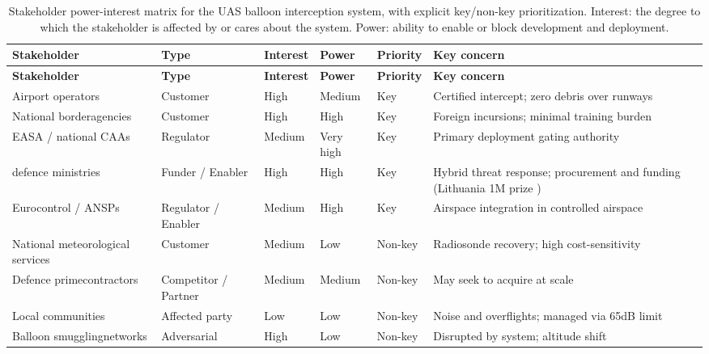 \begin{longtable}{@{}p{3.5cm}p{1.4cm}p{1.3cm}p{1.4cm}p{1.3cm}p{4.5cm}@{}}

\caption{Stakeholder power-interest matrix for the UAS balloon interception system, with explicit key/non-key prioritization. Interest: the degree to which the stakeholder is affected by or cares about the system. Power: ability to enable or block development and deployment.}
\label{tab:stakeholders} \\

\toprule
\textbf{Stakeholder} & \textbf{Type} &
  \textbf{Interest} & \textbf{Power} &
  \textbf{Priority} & \textbf{Key concern} \\
\midrule
\endfirsthead

\toprule
\textbf{Stakeholder} & \textbf{Type} &
  \textbf{Interest} & \textbf{Power} &
  \textbf{Priority} & \textbf{Key concern} \\
\midrule
\endhead

Airport operators & Customer & High & Medium & Key & Certified intercept; zero debris over runways \\[4pt]
 
National border\newline agencies & Customer & High & High & Key & Foreign incursions; minimal training burden \\[4pt]
 
EASA / national CAAs & Regulator & Medium & Very high & Key & Primary deployment gating authority \\[4pt]
 
defence ministries & Funder / Enabler & High & High & Key & Hybrid threat response; procurement and funding (Lithuania \texteuro{}1M prize \cite{RFE/RLBelarusService2025UpBoth}) \\[4pt]
 
Eurocontrol / ANSPs & Regulator / Enabler & Medium & High & Key & Airspace integration in controlled airspace \\[4pt]
 
National meteorological services & Customer & Medium & Low & Non-key & Radiosonde recovery; high cost-sensitivity \\[4pt]
 
Defence prime\newline contractors & Competitor / Partner & Medium & Medium & Non-key & May seek to acquire at scale \\[4pt]
 
Local communities & Affected party & Low & Low & Non-key & Noise and overflights; managed via 65dB limit \\[4pt]
 
Balloon smuggling\newline networks & Adversarial & High & Low & Non-key & Disrupted by system; altitude shift \\

\bottomrule
\end{longtable}

